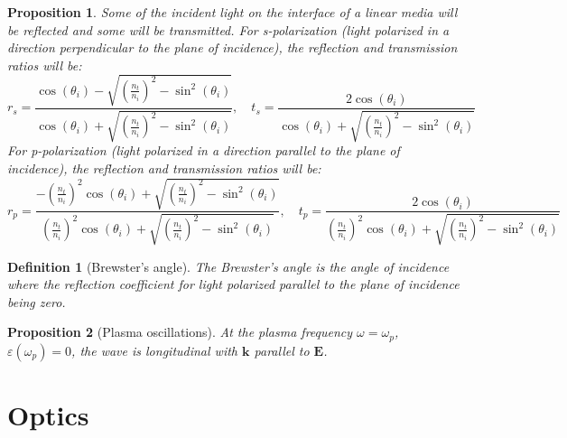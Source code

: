 \documentclass[a4paper]{article}
\theoremstyle{new}
\newtheorem{defi}{Definition}[section]
\newtheorem{prop}{Proposition}[section]
\begin{document}
\begin{prop}
Some of the incident light on the interface of a linear media will be reflected and some will be transmitted. For s-polarization (light polarized in a direction perpendicular to the plane of incidence), the reflection and transmission ratios will be:
$$
r_s=\frac{\cos(\theta_i)-\sqrt{(\frac{n_t}{n_i})^2-\sin^2(\theta_i)}}{\cos(\theta_i)+\sqrt{(\frac{n_t}{n_i})^2-\sin^2(\theta_i)}},\quad t_s=\frac{2\cos(\theta_i)}{\cos(\theta_i)+\sqrt{(\frac{n_t}{n_i})^2-\sin^2(\theta_i)}}$$
For p-polarization (light polarized in a direction parallel to the plane of incidence), the reflection and transmission ratios will be:
$$
r_p=\frac{-(\frac{n_t}{n_i})^2\cos(\theta_i)+\sqrt{(\frac{n_t}{n_i})^2-\sin^2(\theta_i)}}{(\frac{n_t}{n_i})^2\cos(\theta_i)+\sqrt{(\frac{n_t}{n_i})^2-\sin^2(\theta_i)}},\quad t_p=\frac{2\cos(\theta_i)}{(\frac{n_t}{n_i})^2\cos(\theta_i)+\sqrt{(\frac{n_t}{n_i})^2-\sin^2(\theta_i)}}$$
\end{prop}
\begin{defi}[Brewster's angle]
The Brewster's angle is the angle of incidence where the reflection coefficient for light polarized parallel to the plane of incidence being zero.
\end{defi}
\begin{prop}[Plasma oscillations]
At the plasma frequency $\omega=\omega_p$, $\varepsilon(\omega_p)=0$, the wave is longitudinal with $\mathbf{k}$ parallel to $\mathbf{E}$.
\end{prop}
\newpage
\section{Optics}
\end{document}
